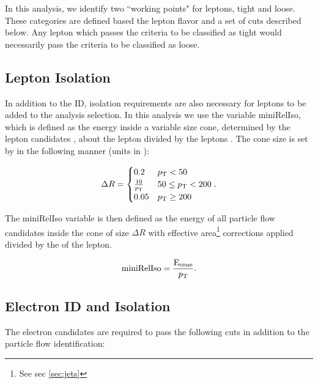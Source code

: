     In this analysis, we identify two ``working points" for leptons, tight and loose. These categories are defined based the lepton flavor and a set of cuts described below. Any lepton which passes the criteria to be classified as tight would necessarily pass the criteria to be classified as loose.

  \subsection{Lepton Isolation}
    In addition to the ID, isolation requirements are also necessary for leptons to be added to the analysis selection. In this analysis we use the variable miniRelIso, which is defined as the energy inside a variable size cone, determined by the lepton candidates \pt, about the lepton divided by the leptons \pt. The cone size is set by \pt in the following manner (units in \GeV):

    \[   
      \Delta R = 
      \begin{cases}
        0.2                & p_{\mathrm{T}} < 50  \\
        \frac{10}{p_{\mathrm{T}}}     & 50 \le p_{\mathrm{T}} < 200 \\
        0.05               & p_{\mathrm{T}} \ge 200 \\
      \end{cases}.
    \]

    The miniRelIso variable is then defined as the energy of all particle flow candidates inside the cone of size $\Delta R$ with effective area\footnote{See sec \ref{sec:jets}} corrections applied divided by the \pt of the lepton.

    \[
      \text{miniRelIso} = \frac{\text{E}_\text{cone}}{p_{\mathrm{T}}}.
    \]

  \subsection{Electron ID and Isolation} \label{sec:electron_id_and_isolation}

    The electron candidates are required to pass the following cuts in addition to the particle flow identification:

